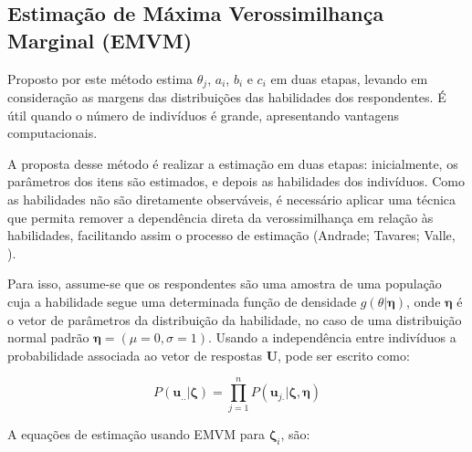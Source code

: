 \begin{comment}
\[
\begin{aligned}
	\hat{a_i}: & \ D(1 - c_i)\sum_{k=1}^{q}[r_{ki} - P_{ki}f_{ki}](\theta_k - b_i)W_{ki} = 0, \\
	\hat{b_i}: & \ -Da_i(1 - c_i)\sum_{k=1}^{q}\left[r_{ki} - P_{ki}f_{ki}\right]W_{ki} = 0, \\
	\hat{c_i}: & \ \sum_{k=1}^{q}(r_{ki} - P_{ki}f_{ki})\frac{W_{ki}}{P^*_{ki}} = 0
\end{aligned}
\]

\end{comment}
\subsection{Estimação de Máxima Verossimilhança Marginal (EMVM)}

Proposto por  este método estima $\theta_j$, $a_i$, $b_i$ e $c_i$ em duas etapas, levando em consideração as margens das distribuições das habilidades dos respondentes. É útil quando o número de indivíduos é grande, apresentando vantagens computacionais.

A proposta desse método é realizar a estimação em duas etapas: inicialmente, os parâmetros dos itens são estimados, e depois as habilidades dos indivíduos. Como as habilidades não são diretamente observáveis, é necessário aplicar uma técnica que permita remover a dependência direta da verossimilhança em relação às habilidades, facilitando assim o processo de estimação (Andrade; Tavares; Valle, \citeyear{de2000teoria}).

Para isso, assume-se que os respondentes são uma amostra de uma população cuja a habilidade segue uma determinada função de densidade $g(\theta|\boldsymbol{\eta})$, onde $\boldsymbol{\eta}$ é o vetor de parâmetros da distribuição da habilidade, no caso de uma distribuição normal padrão $\boldsymbol{\eta} = (\mu = 0, \sigma = 1) $. Usando a independência entre indivíduos a probabilidade associada ao vetor de respostas $\boldsymbol{U}$, pode ser escrito como:

\[
P(\boldsymbol{u}_{..}|\boldsymbol{\zeta}) = \prod_{j=1}^{n}P(\boldsymbol{u}_{j.}|\boldsymbol{\zeta}, \boldsymbol{\eta})
\]

A equações de estimação usando EMVM para $ \boldsymbol{\zeta}_i$, são:\\

\begin{comment}

\[
\hat{a}_i : D(1-c_i)\sum_{j=1}^{s}r_j
\int_{\mathbb{R}}\left[(u_{ji} - P_i)(\theta - b_i)W_i\right] g_j^*(\theta)d\theta = 0,
\]

\[
\hat{b}_i : -Da_i(1-c_i)\sum_{j=1}^{s}r_j
\int_{\mathbb{R}}\left[(u_{ji} - P_i)W_i \right] g_j^*(\theta)d\theta = 0,
\]

\[
\hat{c}_i : \sum_{j=1}^{s}r_j \int_{\mathbb{R}}
\left[(u_{ji}  - P_i)\frac{W_i}{P^*_i}\right]
g_j^*(\theta)d\theta = 0
\]
\end{comment}


